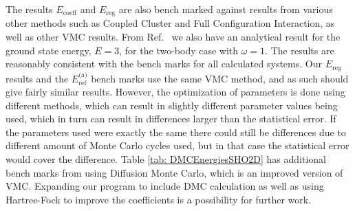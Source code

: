 \documentclass[../main.tex]{subfiles}
\begin{document}
The results $E_\textrm{coeff}$ and $E_\textrm{reg}$ are also bench marked against results from various other methods such as Coupled Cluster and Full Configuration Interaction, as well as other VMC results. From Ref.~\cite{Taut} we also have an analytical result for the ground state energy, $E=3$, for the two-body case with $\omega=1$. The results are reasonably consistent with the bench marks for all calculated systems. Our $E_\textrm{reg}$ results and the $E_\textrm{ref}^\textrm{(a)}$ bench marks use the same VMC method, and as such should give fairly similar results. However, the optimization of parameters is done using different methods, which can result in slightly different parameter values being used, which in turn can result in differences larger than the statistical error. If the parameters used were exactly the same there could still be differences due to different amount of Monte Carlo cycles used, but in that case the statistical error would cover the difference. Table \ref{tab: DMCEnergiesSHO2D} has additional bench marks from using Diffusion Monte Carlo, which is an improved version of VMC. Expanding our program to include DMC calculation as well as using Hartree-Fock to improve the coefficients is a possibility for further work.
\end{document}
